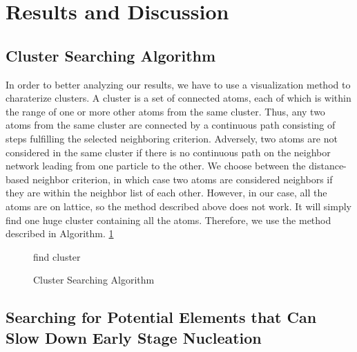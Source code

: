 \section{Results and Discussion}
\label{Chap:Al/Vac:section:RD}
\subsection{Cluster Searching Algorithm}

In order to better analyzing our results, we have to use a visualization method to charaterize clusters. A cluster is a set of connected atoms, each of which is within the range of one or more other atoms from the same cluster. Thus, any two atoms from the same cluster are connected by a continuous path consisting of steps fulfilling the selected neighboring criterion. Adversely, two atoms are not considered in the same cluster if there is no continuous path on the neighbor network leading from one particle to the other. We choose between the distance-based neighbor criterion, in which case two atoms are considered neighbors if they are within the neighbor list of each other. However, in our case, all the atoms are on lattice, so the method described above does not work. It will simply find one huge cluster containing all the atoms. Therefore, we use the method described in Algorithm. \ref{algo:cluster}


\begin{figure}[!htb]
  \centering
  \begin{minipage}{.75\linewidth}
    \begin{algorithm}[H]
      \caption{Cluster Searching Algorithm}\label{algo:cluster}
      \begin{algorithmic}[1]
        \State find cluster
      \end{algorithmic}
    \end{algorithm}
  \end{minipage}
\end{figure}






\subsection{Searching for Potential Elements that Can Slow Down Early Stage Nucleation}